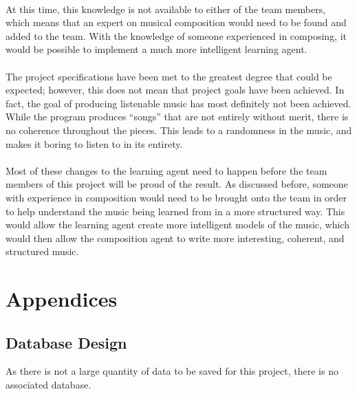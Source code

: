 \documentclass{article}
\begin{document}
\\
At this time, this knowledge is not available to either of the team members, which means that an expert on musical composition would need to be found and added to the team. With the knowledge of someone experienced in composing, it would be possible to implement a much more intelligent learning agent.\\
\\
The project specifications have been met to the greatest degree that could be expected; however, this does not mean that project goals have been achieved. In fact, the goal of producing listenable music has most definitely not been achieved. While the program produces “songs” that are not entirely without merit, there is no coherence throughout the pieces. This leads to a randomness in the music, and makes it boring to listen to in its entirety.\\
\\
Most of these changes to the learning agent need to happen before the team members of this project will be proud of the result. As discussed before, someone with experience in composition would need to be brought onto the team in order to help understand the music being learned from in a more structured way. This would allow the learning agent create more intelligent models of the music, which would then allow the composition agent to write more interesting, coherent, and structured music.

\newpage

\section{Appendices}
\subsection{Database Design}
As there is not a large quantity of data to be saved for this project, there is no associated 
database.
\end{document}
